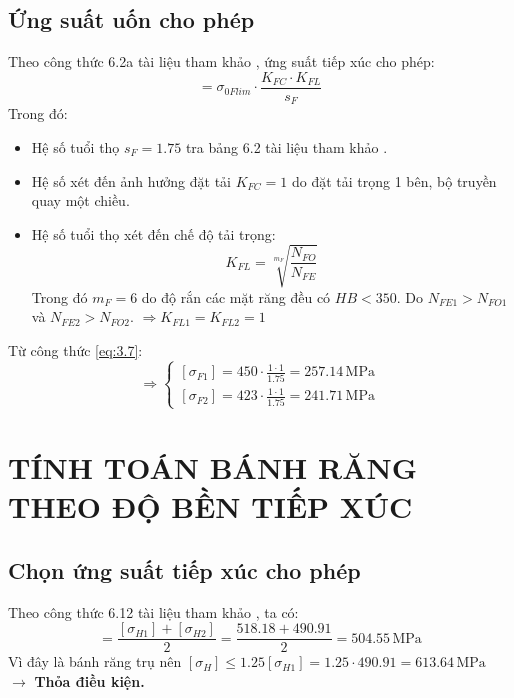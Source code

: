         \subsection{Ứng suất uốn cho phép}
            \hspace*{0.6cm}Theo công thức 6.2a tài liệu tham khảo \cite{tltk1}, ứng suất tiếp xúc cho phép:
            \begin{equation}
                [\sigma_{F}] = \sigma_{0Flim} \cdot \frac{K_{FC} \cdot K_{FL}}{s_{F}}
                \label{eq:3.7}
            \end{equation} 
            \hspace*{0.6cm}Trong đó:
            \begin{itemize}
                \item Hệ số tuổi thọ $s_F = 1.75$ tra bảng 6.2 tài liệu tham khảo \cite{gtctm}.
                \item Hệ số xét đến ảnh hưởng đặt tải $K_{FC} = 1$ do đặt tải trọng 1 bên, bộ truyền quay một chiều.
                \item Hệ số tuổi thọ xét đến chế độ tải trọng: 
                    \begin{equation}
                        K_{FL} = \sqrt[m_F]{\frac{N_{FO}}{N_{FE}}} 
                        \label{eq:3.8}
                    \end{equation}
                    Trong đó $m_F = 6$ do độ rắn các mặt răng đều có $HB < 350$. Do $N_{FE1} > N_{FO1}$ và $N_{FE2} > N_{FO2}$. $\Rightarrow K_{FL1} = K_{FL2} = 1$\\
            \end{itemize}
            \hspace*{0.6cm}Từ công thức \ref{eq:3.7}:
            \[
            \Rightarrow
            \begin{cases}
                [\sigma_{F1}] = 450 \cdot \frac{1 \cdot 1}{1.75} = 257.14 \, \mathrm{MPa} \\
                [\sigma_{F2}] = 423 \cdot \frac{1 \cdot 1}{1.75} =  241.71\, \mathrm{MPa}
            \end{cases}
            \] 
    \section{TÍNH TOÁN BÁNH RĂNG THEO ĐỘ BỀN TIẾP XÚC}
        \subsection{Chọn ứng suất tiếp xúc cho phép}
            \hspace*{0.6cm}Theo công thức 6.12 tài liệu tham khảo \cite{tltk1}, ta có:
            \begin{equation}
                [\sigma_{H}] = \frac{[\sigma_{H1}] + [\sigma_{H2}]}{2} = \frac{518.18 + 490.91}{2} = 504.55 \, \mathrm{MPa}
                \label{eq:3.9}
            \end{equation}
            \hspace*{0.6cm}Vì đây là bánh răng trụ nên $[\sigma_H] \leq 1.25[\sigma_{H1}] = 1.25 \cdot 490.91 = 613.64\, \mathrm{MPa}$ $\rightarrow$ \textbf{Thỏa điều kiện.}
